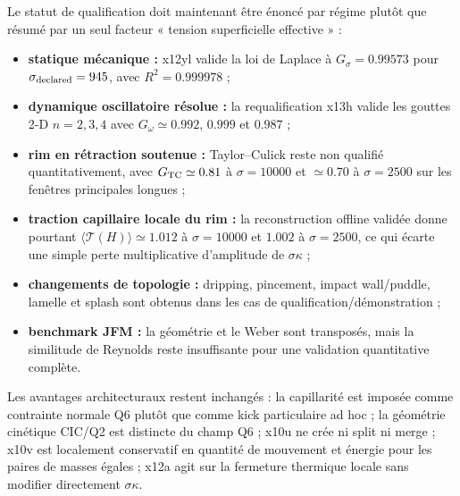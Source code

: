 \documentclass[11pt,a4paper]{article}
\begin{document}
Le statut de qualification doit maintenant être énoncé par régime plutôt que résumé par un seul facteur « tension superficielle effective » :
\begin{itemize}[leftmargin=2em]
  \item \textbf{statique mécanique :} x12yl valide la loi de Laplace à $G_\sigma=0.99573$ pour $\sigma_{\rm declared}=945$, avec $R^2=0.999978$ ;
  \item \textbf{dynamique oscillatoire résolue :} la requalification x13h valide les gouttes 2-D $n=2,3,4$ avec $G_\omega\simeq0.992$, $0.999$ et $0.987$ ;
  \item \textbf{rim en rétraction soutenue :} Taylor--Culick reste non qualifié quantitativement, avec $G_{\rm TC}\simeq0.81$ à $\sigma=10000$ et $\simeq0.70$ à $\sigma=2500$ sur les fenêtres principales longues ;
  \item \textbf{traction capillaire locale du rim :} la reconstruction offline validée donne pourtant $\langle\mathcal T(H)\rangle\simeq1.012$ à $\sigma=10000$ et $1.002$ à $\sigma=2500$, ce qui écarte une simple perte multiplicative d'amplitude de $\sigma\kappa$ ;
  \item \textbf{changements de topologie :} dripping, pincement, impact wall/puddle, lamelle et splash sont obtenus dans les cas de qualification/démonstration ;
  \item \textbf{benchmark JFM :} la géométrie et le Weber sont transposés, mais la similitude de Reynolds reste insuffisante pour une validation quantitative complète.
\end{itemize}

Les avantages architecturaux restent inchangés : la capillarité est imposée comme contrainte normale Q6 plutôt que comme kick particulaire ad hoc ; la géométrie cinétique CIC/Q2 est distincte du champ Q6 ; x10u ne crée ni split ni merge ; x10v est localement conservatif en quantité de mouvement et énergie pour les paires de masses égales ; x12a agit sur la fermeture thermique locale sans modifier directement $\sigma\kappa$.
\end{document}
